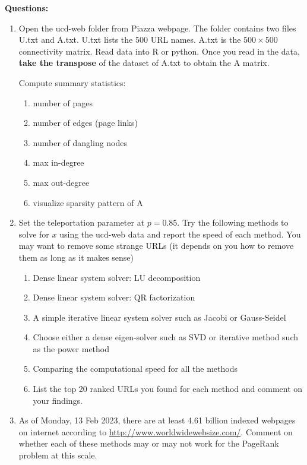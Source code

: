 \documentclass[twoside, letter]{article}
\begin{document}
{\Large \bf Questions:}

\begin{enumerate}

\item Open the ucd-web folder from Piazza webpage. The folder contains
two files U.txt and A.txt. U.txt lists the 500 URL names. A.txt is the $500 \times 500$
connectivity matrix. Read data into R or python. Once you read in the data, {\bf take the transpose} of the dataset of A.txt to obtain the A matrix. 

Compute summary statistics:
\begin{enumerate}
\item number of pages
\item number of edges (page links)
\item number of dangling nodes
\item max in-degree
\item max out-degree
\item visualize sparsity pattern of A
\end{enumerate}


\item Set the teleportation parameter at $p = 0.85$. Try the following methods to solve for $x$ using
the ucd-web data and report the speed of each method. You may want to remove some strange URLs (it depends on you how to remove them as long as it makes sense) 
\begin{enumerate}
\item Dense linear system solver: LU decomposition 
\item Dense linear system solver: QR factorization
\item A simple iterative linear system solver such as Jacobi or Gauss-Seidel
\item Choose either a dense eigen-solver such as SVD or iterative method such as the power method
\item Comparing the computational speed for all the methods
\item List the top 20 ranked URLs you found for each method and comment on your findings.

\end{enumerate}


\item As of Monday, 13 Feb 2023, there are at least 4.61 billion indexed webpages on internet according
to \url{http://www.worldwidewebsize.com/}. Comment on whether each of these methods
may or may not work for the PageRank problem at this scale.

\end{enumerate}





 
\end{document}
